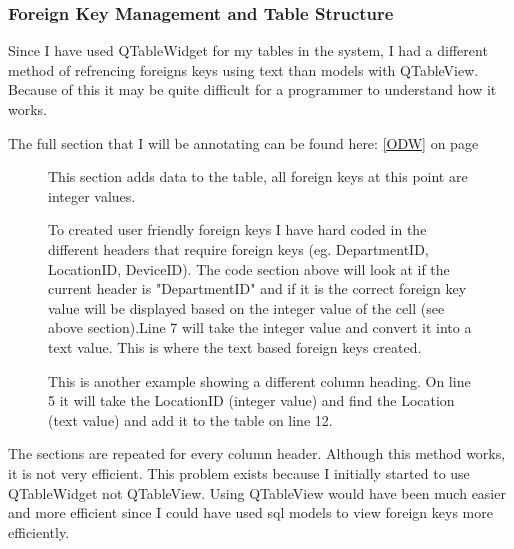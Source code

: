 \begin{landscape}
\subsubsection{Foreign Key Management and Table Structure}

Since I have used QTableWidget for my tables in the system, I had a different method of refrencing foreigns keys using text  than models with QTableView. Because of this it may be quite difficult for a programmer to understand how it works.

The full section that I will be annotating can be found here: \ref{ODW} on page \pageref{ODW}

\begin{figure}[H]
    \caption{This section adds data to the table, all foreign keys at this point are integer values.}  
\end{figure}

\begin{figure}[H]
\begin{small}
\end{small}
    \caption{To created user friendly foreign keys I have hard coded in the different headers that require foreign keys (eg. DepartmentID, LocationID, DeviceID). The code section above will look at if the current header is "DepartmentID" and if it is the correct foreign key value will be displayed based on the integer value of the cell (see above section).\newline Line 7 will take the integer value and convert it into a text value. This is where the text based foreign keys created.}  
\end{figure}

\begin{figure}[H]
\begin{small}
\end{small}
    \caption{This is another example showing a different column heading. On line 5 it will take the LocationID (integer value) and find the Location (text value) and add it to the table on line 12.}  
\end{figure}

The sections are repeated for every column header. Although this method works, it is not very efficient. This problem exists because I initially started to use QTableWidget not QTableView. Using QTableView would have been much easier and more efficient since I could have used sql models to view foreign keys more efficiently.
\newpage

\end{landscape}
